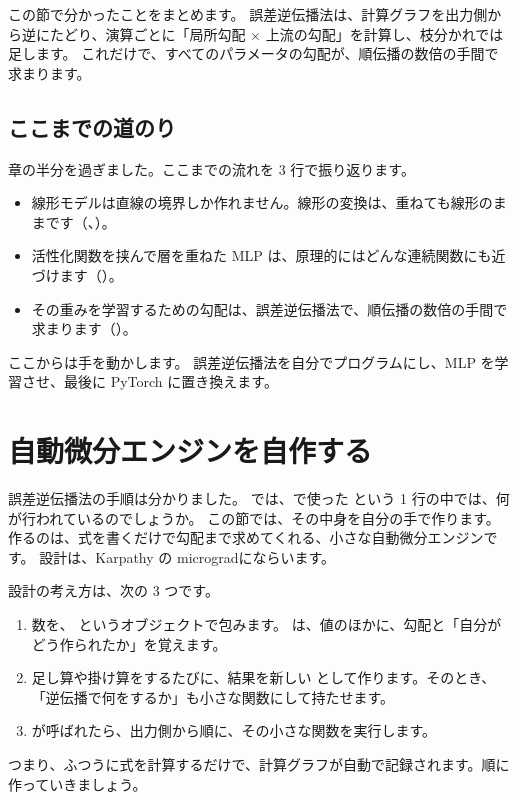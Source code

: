 この節で分かったことをまとめます。
誤差逆伝播法は、計算グラフを出力側から逆にたどり、演算ごとに「局所勾配 $\times$ 上流の勾配」を計算し、枝分かれでは足します。
これだけで、すべてのパラメータの勾配が、順伝播の数倍の手間で求まります。

\subsection*{ここまでの道のり}

章の半分を過ぎました。ここまでの流れを 3 行で振り返ります。
\begin{itemize}
\item 線形モデルは直線の境界しか作れません。線形の変換は、重ねても線形のままです（、）。
\item 活性化関数を挟んで層を重ねた MLP は、原理的にはどんな連続関数にも近づけます（）。
\item その重みを学習するための勾配は、誤差逆伝播法で、順伝播の数倍の手間で求まります（）。
\end{itemize}
ここからは手を動かします。
誤差逆伝播法を自分でプログラムにし、MLP を学習させ、最後に PyTorch に置き換えます。

\section{自動微分エンジンを自作する}\label{sec:nn-value}

誤差逆伝播法の手順は分かりました。
では、で使った  という 1 行の中では、何が行われているのでしょうか。
この節では、その中身を自分の手で作ります。
作るのは、式を書くだけで勾配まで求めてくれる、小さな自動微分エンジンです。
設計は、Karpathy の micrograd\cite{karpathy2022micrograd}にならいます。

設計の考え方は、次の 3 つです。
\begin{enumerate}
\item 数を、 というオブジェクトで包みます。 は、値のほかに、勾配と「自分がどう作られたか」を覚えます。
\item 足し算や掛け算をするたびに、結果を新しい  として作ります。そのとき、「逆伝播で何をするか」も小さな関数にして持たせます。
\item {} が呼ばれたら、出力側から順に、その小さな関数を実行します。
\end{enumerate}
つまり、ふつうに式を計算するだけで、計算グラフが自動で記録されます。順に作っていきましょう。

